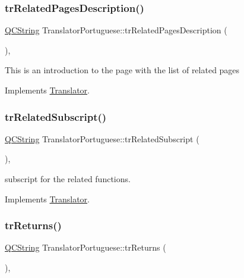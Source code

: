 \subsubsection{\texorpdfstring{trRelatedPagesDescription()}{trRelatedPagesDescription()}}
{\footnotesize\ttfamily \mbox{\hyperlink{class_q_c_string}{Q\+C\+String}} Translator\+Portuguese\+::tr\+Related\+Pages\+Description (\begin{DoxyParamCaption}{ }\end{DoxyParamCaption})\hspace{0.3cm}{\ttfamily [inline]}, {\ttfamily [virtual]}}

This is an introduction to the page with the list of related pages 

Implements \mbox{\hyperlink{class_translator}{Translator}}.

\mbox{\label{class_translator_portuguese_a6aea8d18283e8182a67726fccd68b744}} 
\subsubsection{\texorpdfstring{trRelatedSubscript()}{trRelatedSubscript()}}
{\footnotesize\ttfamily \mbox{\hyperlink{class_q_c_string}{Q\+C\+String}} Translator\+Portuguese\+::tr\+Related\+Subscript (\begin{DoxyParamCaption}{ }\end{DoxyParamCaption})\hspace{0.3cm}{\ttfamily [inline]}, {\ttfamily [virtual]}}

subscript for the related functions. 

Implements \mbox{\hyperlink{class_translator}{Translator}}.

\mbox{\label{class_translator_portuguese_ac3fed63636617d973fdb1e745e1ac65e}} 
\subsubsection{\texorpdfstring{trReturns()}{trReturns()}}
{\footnotesize\ttfamily \mbox{\hyperlink{class_q_c_string}{Q\+C\+String}} Translator\+Portuguese\+::tr\+Returns (\begin{DoxyParamCaption}{ }\end{DoxyParamCaption})\hspace{0.3cm}{\ttfamily [inline]}, {\ttfamily [virtual]}}

